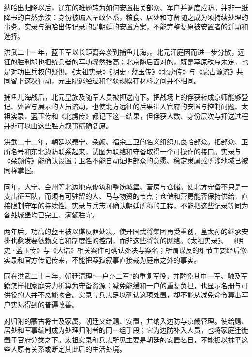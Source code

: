 纳哈出归降以后，辽东的难题转为如何安置相关部众、军户并调度戍防。并非一纸降书的自然余波：身份被编入军政体系，粮食、居处和守备随之成为须持续处理的事务。实录与纳哈出传记录的是朝廷的安置方案，不能完整复原被安置者的迁动和选择。

洪武二十一年，蓝玉军以长距离奔袭到捕鱼儿海，。北元汗庭因而进一步分散，远征的胜利却也把统兵者的军功骤然抬高；北京随后面对的，既是草原秩序未定，也是对功臣兵权的疑惧。《太祖实录》《明史·蓝玉传》《北虏传》与《蒙古源流》共同留下这次行动，元主脱逃经过和俘获规模在材料之间并不相同。

捕鱼儿海战后，北元皇族及随军人员被押送南下。把战场上的俘获转成京师能够登记、处置与展示的人员流动，也使北方远征的后果进入官府的安置与控制问题。太祖实录、蓝玉传和《北虏传》都记下这一结果，但俘获人数、身份层次与押送过程并非可以由这些胜方叙事精确复原。

洪武二十二年，朝廷以泰宁、朵颜、福余三卫的名义组织兀良哈部众。把部众、卫所名号和东北边防联系起来，试图为联络和守备取得一个可操作的接口。实录与《朵颜传》能确认设置；卫名不能自动证明部众的意愿、稳定隶属或所涉地域已被同样掌握。

同年，大宁、会州等北边地点修筑和整饬城堡、营房与仓储。使北方守备不只是一支出征军队，而须有可驻留的人、马与物资的节点；仓储和营房能否保持供给，直接限制守军的持续性。实录与兵志可确认朝廷所称的工程，不能把这些记录等同为各处城堡均已完工、满额驻守。

两年后，功高的蓝玉被以谋反罪处决。使开国武将集团再受重创，皇太孙的继承安排也愈发要依赖文官和制度性的控制，而非这些将领的网络。《太祖实录》、 《明史·蓝玉传》与《大诰》相关案件可确认处决与案名；所谓谋反的细节主要经后修实录和官方传记传来，不能把案狱叙事直接裁为庭审之外的事实。

同在洪武二十三年，朝廷清理“一户充二军”的重复军役，并酌免其中一军。触及军籍怎样把家庭劳力折算为守备资源：减免能缓和一户的重复负担，也显示名册与可供役的人并不总能吻合。实录与兵志足以确认这项处置，却不能从减免命令算出军户实际得到的普遍改善。

对归附的蒙古将士及家属，朝廷又给赐、安置，并纳入边防与京畿管理。使给赐、居处和军事编制成为处理归附者的同一组手段；它为边防补入人员，也将家庭迁徙置于官府分类之下。太祖实录和兵志所见主要是朝廷的安置名目，不能据以抹平这些人原有关系或断定其此后的生活处境。

